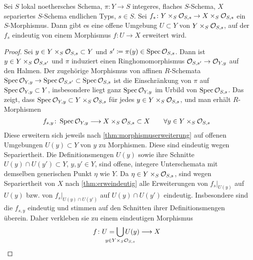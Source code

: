 \documentclass[german, bibliography=totoc]{scrreprt}
\begin{document}
\begin{Korollar}\label{thm:allgmorphismuserweiterung}
  Sei $S$ lokal noethersches Schema,
  $\pi\colon Y\to S$ integeres, flaches $S$-Schema,
  $X$ separiertes $S$-Schema endlichen Typs,
  $s\in S$.
  Sei $f_s\colon Y\times_S\mathcal{O}_{S,s}\to X\times_S\mathcal{O}_{S,s}$ ein
  $S$-Morphismus.
  Dann gibt es eine offene Umgebung $U\subset Y$ von
  $Y\times_S\mathcal{O}_{S,s}$, auf der $f_s$ eindeutig von einem Morphismus
  $f\colon U\to X$ erweitert wird.
  \begin{proof}
    Sei $y\in Y\times_S\mathcal{O}_{S,s}\subset Y$ und
    $s'\coloneqq\pi(y)\in\operatorname{Spec}\mathcal{O}_{S,s}$. Dann ist $y\in
    Y\times_S\mathcal{O}_{S,s'}$ und $\pi$ induziert einen
    Ringhomomorphismus $\mathcal{O}_{S,s'}\to\mathcal{O}_{Y,y}$ auf den Halmen. Der
    zugehörige Morphismus von affinen $R$-Schemata
    $\operatorname{Spec}\mathcal{O}_{Y,y}\to\operatorname{Spec}\mathcal{O}_{S,s'}\subset\operatorname{Spec}\mathcal{O}_{S,s}$ ist die
    Einschränkung von $\pi$ auf $\operatorname{Spec}\mathcal{O}_{Y,y}\subset Y$, insbesondere
    liegt ganz $\operatorname{Spec}\mathcal{O}_{Y,y}$ im Urbild von $\operatorname{Spec}\mathcal{O}_{S,s}$.
    Das zeigt, dass $\operatorname{Spec}\mathcal{O}_{Y,y}\subset Y\times_S\mathcal{O}_{S,s}$ für jedes
    $y\in Y\times_S\mathcal{O}_{S,s}$, und man erhält $R$-Morphismen
    \begin{gather*}
      f_{s,y}\colon \operatorname{Spec}\mathcal{O}_{Y,y}\longrightarrow X\times_S\mathcal{O}_{S,s}\subset X
      \qquad \forall y \in Y\times_S\mathcal{O}_{S,s}
    \end{gather*}
    Diese erweitern sich jeweils nach
    \ref{thm:morphismuserweiterung} auf offenen
    Umgebungen $U(y)\subset Y$ von $y$ zu Morphismen.
    Diese sind eindeutig wegen Separiertheit.
    Die Definitionsmengen $U(y)$ sowie ihre Schnitte $U(y)\cap
    U(y')\subset Y$, $y,y'\in Y$, sind offene, integere
    Unterschemata mit demselben generischen Punkt $\eta$ wie $Y$.
    Da $\eta\in Y\times_S\mathcal{O}_{S,s}$, sind wegen Separiertheit von $X$
    nach \ref{thm:erweindeutig} alle Erweiterungen von 
    $f_s|_{U(y)}$ auf $U(y)$ bzw. von $f_s|_{U(y)\cap U(y')}$ auf
    $U(y)\cap U(y')$ eindeutig.
    Insbesondere sind die $f_{s,y}$ eindeutig und stimmen auf den
    Schnitten ihrer Definitionsmengen überein.
    Daher verkleben sie zu einem eindeutigen Morphismus
    \begin{gather*}
      f\colon U=\bigcup_{\mathclap{y\in Y\times_S\O_{S,s}}} U(y)\longto X
    \end{gather*}
  \end{proof}
\end{Korollar}
\end{document}

